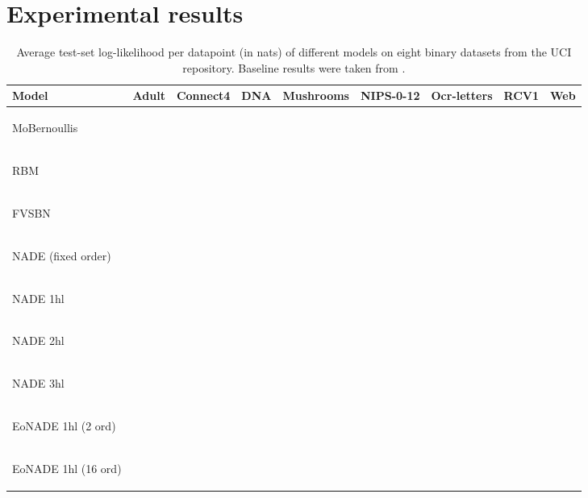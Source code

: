 \documentclass{article}
\begin{document}
\section{Experimental results}
\label{sec:experiments}
\begin{table*}
\caption{Average test-set log-likelihood per datapoint (in nats) of different
models on eight binary datasets from the UCI repository. Baseline results were
taken from \citet{Larochelle+Murray-2011}.}
\label{tab:NADE-UCI-results}
\centering
\begin{tabular}{lcccccccc}
\toprule
{Model} & {Adult} & {Connect4} & {DNA} & {Mushrooms} & {NIPS-0-12} &
{Ocr-letters} & {RCV1} & {Web}\\
\midrule
\begin{small}MoBernoullis\end{small} &  &  &  &
 &  &  &  &  \\
\begin{small}RBM \end{small} &  &  &  &
 &  &  &  &  \\
\begin{small}FVSBN \end{small} &  &  &
 &  &  &  &  &  \\
\begin{small}NADE (fixed order) \end{small} &  &  &
 &  &  &  &  &  \\
\hline
\begin{small}NADE 1hl\end{small}&  &  &  &  &
 &  &  & \\
\begin{small}NADE 2hl\end{small}&  &  &  &  &
 &  &  & \\
\begin{small}NADE 3hl\end{small}&  &  &  &
 &  &  &  & \\
\begin{small}EoNADE 1hl (2 ord)\end{small}\hspace{-3ex} &  &  &
 &  &  &  &  & 
\\
\begin{small}EoNADE 1hl (16 ord)\end{small}\hspace{-3ex} &  &  &
 &  &  &  &  &

\\
\bottomrule
\end{tabular}
\end{table*}
\end{document}
